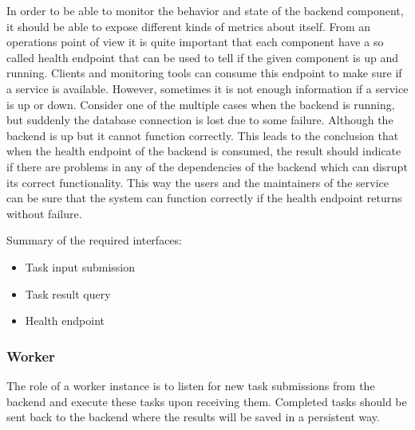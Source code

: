 In order to be able to monitor the behavior and state of the backend component, it should be able to expose different kinds of metrics about itself. From an operations point of view it is quite important that each component have a so called health endpoint that can be used to tell if the given component is up and running. Clients and monitoring tools can consume this endpoint to make sure if a service is available. However, sometimes it is not enough information if a service is up or down. Consider one of the multiple cases when the backend is running, but suddenly the database connection is lost due to some failure. Although the backend is up but it cannot function correctly. This leads to the conclusion that when the health endpoint of the backend is consumed, the result should indicate if there are problems in any of the dependencies of the backend which can disrupt its correct functionality. This way the users and the maintainers of the service can be sure that the system can function correctly if the health endpoint returns without failure.

Summary of the required interfaces: \begin{itemize}
	\item Task input submission
	\item Task result query
	\item Health endpoint
\end{itemize}

\subsubsection{Worker}

%

The role of a worker instance is to listen for new task submissions from the backend and execute these tasks upon receiving them. Completed tasks should be sent back to the backend where the results will be saved in a persistent way.

